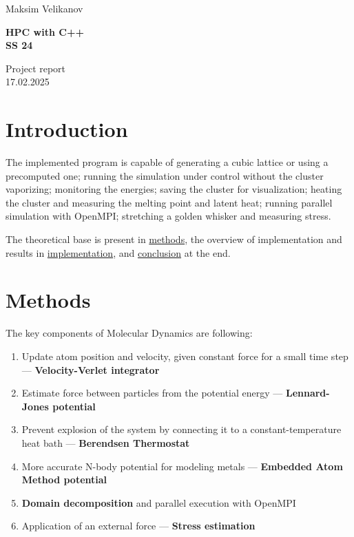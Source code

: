 \documentclass[12pt,a4paper]{article}
\title{}
\author{}
\begin{document}
\parbox{0.333\textwidth}{
	Maksim Velikanov \\[0mm]
}
\parbox{0.333\textwidth}{\vspace*{1mm}\begin{center}\large\bf%
		HPC with C++\\[0mm]
		SS 24\\[0mm]
\end{center}}
\parbox{0.333\textwidth}{
	\begin{flushright}
		Project report\\[0mm]
		17.02.2025\\[0mm]
	\end{flushright}
}
\par\vspace{-5mm}
\vspace*{2mm}
\raisebox{1.19cm}{%
	\textcolor{freiburg-gray}{\rule{\textwidth}{1.1mm}}}

\bigskip




\section{Introduction}

The implemented program is capable of generating a cubic lattice or using a precomputed one; running the simulation under control without the cluster vaporizing; monitoring the energies; saving the cluster for visualization; heating the cluster and measuring the melting point and latent heat; running parallel simulation with OpenMPI; stretching a golden whisker and measuring stress.

The theoretical base is present in \hyperref[methods]{methods}, the overview of implementation and results in \hyperref[implementation]{implementation}, and \hyperref[conclusion]{conclusion} at the end.

\section{Methods}
\label{methods}

The key components of Molecular Dynamics are following:

\begin{enumerate}
	\item Update atom position and velocity, given constant force for a small time step --- {\bf Velocity-Verlet integrator}
	\item Estimate force between particles from the potential energy --- {\bf Lennard-Jones potential}
	\item Prevent explosion of the system by connecting it to a constant-temperature heat bath --- {\bf Berendsen Thermostat}
	\item More accurate N-body potential for modeling metals --- {\bf Embedded Atom Method potential}
	\item {\bf Domain decomposition} and parallel execution with OpenMPI
	\item Application of an external force --- {\bf Stress estimation}
\end{enumerate}
\end{document}
